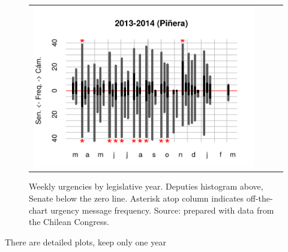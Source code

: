 \documentclass[letter,12pt]{article}
\begin{document}
\begin{figure}
\begin{center}
\begin{tabular}{cccc}
    \includegraphics[width=.22\columnwidth]{../graphs/urgenciasHistog2013.pdf} \\
\end{tabular}
  \caption{Weekly urgencies by legislative year. Deputies histogram above, Senate below the zero line. Asterisk atop column indicates off-the-chart urgency message frequency. Source: prepared with data from the Chilean Congress.}\label{f:depvarHistog}
\end{center}
\end{figure}


There are detailed plots, keep only one year


\end{document}

